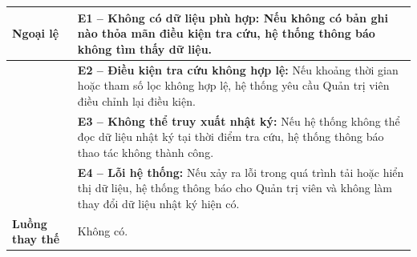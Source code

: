 \begin{longtable}{|>{\raggedright\arraybackslash}p{2.9cm}|p{12.3cm}|}
\textbf{Ngoại lệ} & \textbf{E1 -- Không có dữ liệu phù hợp:} Nếu không có bản ghi nào thỏa mãn điều kiện tra cứu, hệ thống thông báo không tìm thấy dữ liệu. \\ \cline{2-2}
 & \textbf{E2 -- Điều kiện tra cứu không hợp lệ:} Nếu khoảng thời gian hoặc tham số lọc không hợp lệ, hệ thống yêu cầu Quản trị viên điều chỉnh lại điều kiện. \\ \cline{2-2}
 & \textbf{E3 -- Không thể truy xuất nhật ký:} Nếu hệ thống không thể đọc dữ liệu nhật ký tại thời điểm tra cứu, hệ thống thông báo thao tác không thành công. \\ \cline{2-2}
 & \textbf{E4 -- Lỗi hệ thống:} Nếu xảy ra lỗi trong quá trình tải hoặc hiển thị dữ liệu, hệ thống thông báo cho Quản trị viên và không làm thay đổi dữ liệu nhật ký hiện có. \\ \hline
\textbf{Luồng thay thế} & Không có. \\ \hline
\end{longtable}

